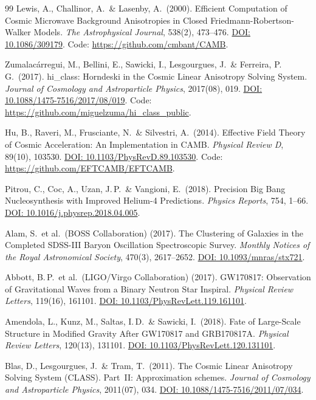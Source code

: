 \documentclass[aps,prd,twocolumn,superscriptaddress,nofootinbib,floatfix]{revtex4-2}
\begin{document}
\begin{thebibliography}{99}
Lewis, A., Challinor, A.\ \& Lasenby, A.\ (2000).
Efficient Computation of Cosmic Microwave Background Anisotropies in Closed Friedmann-Robertson-Walker Models.
\textit{The Astrophysical Journal}, 538(2), 473--476.
\href{https://doi.org/10.1086/309179}{DOI: 10.1086/309179}. Code: \url{https://github.com/cmbant/CAMB}.

Zumalac\'arregui, M., Bellini, E., Sawicki, I., Lesgourgues, J.\ \& Ferreira, P.\,G.\ (2017).
hi\_class: Horndeski in the Cosmic Linear Anisotropy Solving System.
\textit{Journal of Cosmology and Astroparticle Physics}, 2017(08), 019.
\href{https://doi.org/10.1088/1475-7516/2017/08/019}{DOI: 10.1088/1475-7516/2017/08/019}. Code: \url{https://github.com/miguelzuma/hi_class_public}.

Hu, B., Raveri, M., Frusciante, N.\ \& Silvestri, A.\ (2014).
Effective Field Theory of Cosmic Acceleration: An Implementation in CAMB.
\textit{Physical Review D}, 89(10), 103530.
\href{https://doi.org/10.1103/PhysRevD.89.103530}{DOI: 10.1103/PhysRevD.89.103530}. Code: \url{https://github.com/EFTCAMB/EFTCAMB}.

Pitrou, C., Coc, A., Uzan, J.\,P.\ \& Vangioni, E.\ (2018).
Precision Big Bang Nucleosynthesis with Improved Helium-4 Predictions.
\textit{Physics Reports}, 754, 1--66.
\href{https://doi.org/10.1016/j.physrep.2018.04.005}{DOI: 10.1016/j.physrep.2018.04.005}.

Alam, S.\ et al.\ (BOSS Collaboration) (2017).
The Clustering of Galaxies in the Completed SDSS-III Baryon Oscillation Spectroscopic Survey.
\textit{Monthly Notices of the Royal Astronomical Society}, 470(3), 2617--2652.
\href{https://doi.org/10.1093/mnras/stx721}{DOI: 10.1093/mnras/stx721}.

Abbott, B.\,P.\ et al.\ (LIGO/Virgo Collaboration) (2017).
GW170817: Observation of Gravitational Waves from a Binary Neutron Star Inspiral.
\textit{Physical Review Letters}, 119(16), 161101.
\href{https://doi.org/10.1103/PhysRevLett.119.161101}{DOI: 10.1103/PhysRevLett.119.161101}.

Amendola, L., Kunz, M., Saltas, I.\,D.\ \& Sawicki, I.\ (2018).
Fate of Large-Scale Structure in Modified Gravity After GW170817 and GRB170817A.
\textit{Physical Review Letters}, 120(13), 131101.
\href{https://doi.org/10.1103/PhysRevLett.120.131101}{DOI: 10.1103/PhysRevLett.120.131101}.

Blas, D., Lesgourgues, J.\ \& Tram, T.\ (2011).
The Cosmic Linear Anisotropy Solving System (CLASS). Part~II: Approximation schemes.
\textit{Journal of Cosmology and Astroparticle Physics}, 2011(07), 034.
\href{https://doi.org/10.1088/1475-7516/2011/07/034}{DOI: 10.1088/1475-7516/2011/07/034}.


\end{thebibliography}
\end{document}
